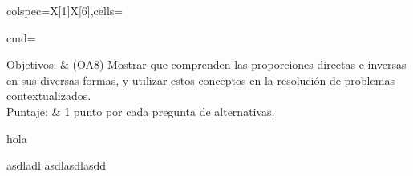 \documentclass[sin curso]{plantilla-evaluacion-v1}
\begin{document}
\begin{importante}
  \begin{tblr}{colspec={X[1]X[6]},cells={cmd=\raggedright}}
    Objetivos: &
    (OA8) Mostrar que comprenden las proporciones directas e inversas
    en sus diversas formas, y utilizar estos conceptos en la resolución de problemas
    contextualizados. \\
    Puntaje: &
    1 punto por cada pregunta de alternativas.\\
  \end{tblr}
\end{importante}
hola


asdladl 
asdlasdlasdd 
\end{document}
